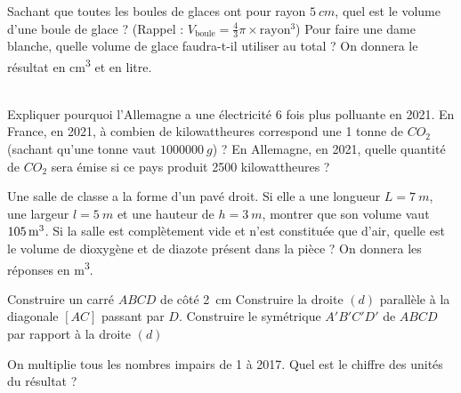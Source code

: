 \documentclass[../Cours.tex]{subfiles}
\begin{document}
\begin{questions}
    \question Sachant que toutes les boules de glaces ont pour rayon $\qty{5}{cm}$, quel est le volume d'une boule de glace ? (Rappel : $V_{\mbox{boule}} = \frac{4}{3} \pi \times \mbox{rayon}^3$)
    \question Pour faire une dame blanche, quelle volume de glace faudra-t-il utiliser au total ? On donnera le résultat en \unit{\centi\metre\cubed} et en \unit{litre}.

    \\

    \question Expliquer pourquoi l'Allemagne a une électricité 6 fois plus polluante en 2021.
    \question En France, en 2021, à combien de kilowattheures correspond une 1 tonne de $CO_2$ (sachant qu'une tonne vaut $\qty{1000000}{g}$) ?
    \question En Allemagne, en 2021, quelle quantité de $CO_2$ sera émise si ce pays produit \num{2500} kilowattheures ?

    \clearpage

    \question Une salle de classe a la forme d'un pavé droit. Si elle a une longueur $L=\qty{7}{m}$, une largeur $l=\qty{5}{m}$ et une hauteur de $h=\qty{3}{m}$, montrer que son volume vaut $\qty{105}{m\cubed}$.
    \question Si la salle est complètement vide et n'est constituée que d'air, quelle est le volume de dioxygène et de diazote présent dans la pièce ? On donnera les réponses en \unit{\metre\cubed}.


    \question Construire un carré $ABCD$ de côté \qty{2}{\centi\metre}
    \question Construire la droite $(d)$ parallèle à la diagonale $[AC]$ passant par $D$.
    \question Construire le symétrique $A'B'C'D'$ de $ABCD$ par rapport à la droite $(d)$



    \question On multiplie tous les nombres impairs de 1 à 2017. Quel est le chiffre des unités du résultat ?

    
    
\end{questions}
\end{document}
